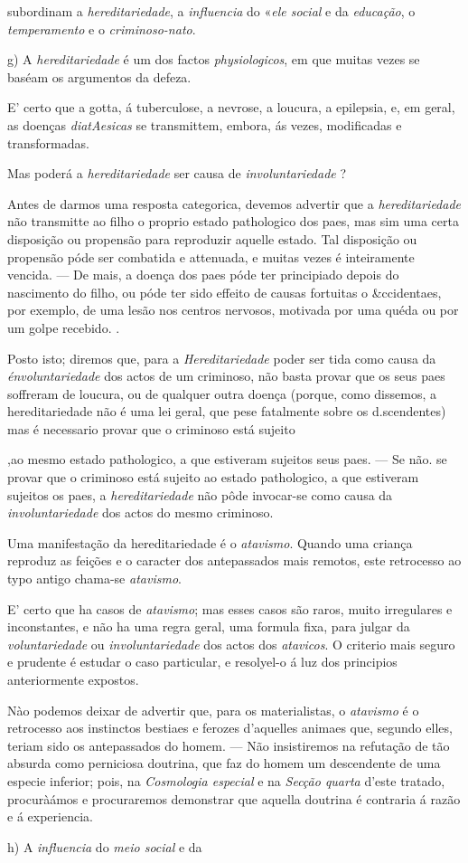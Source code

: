 subordinam a \emph{hereditariedade}, a \emph{influencia} do «\emph{ele social} e da \emph{educação}, o \emph{temperamento} e o \emph{criminoso-nato}.\par g) A \emph{hereditariedade} é um dos factos \emph{physiologicos}, em que muitas vezes se baséam os argumentos da defeza.\par E' certo que a gotta, á tuberculose, a nevrose, a loucura, a epilepsia, e, em geral, as doenças \emph{diatAesicas} se transmittem, embora, ás vezes, modificadas e transformadas.\par Mas poderá a \emph{hereditariedade} ser causa de \emph{involuntariedade} ?\par Antes de darmos uma resposta categorica, devemos advertir que a \emph{hereditariedade} não transmitte ao filho o proprio estado pathologico dos paes, mas sim uma certa disposição ou propensão para reproduzir aquelle estado. Tal disposição ou propensão póde ser combatida e attenuada, e muitas vezes é inteiramente vencida. --- De mais, a doença dos paes póde ter principiado depois do nascimento do filho, ou póde ter sido effeito de causas fortuitas o \&ccidentaes, por exemplo, de uma lesão nos centros nervosos, motivada por uma quéda ou por um golpe recebido. .\par Posto isto; diremos que, para a \emph{Hereditariedade} poder ser tida como causa da \emph{énvoluntariedade} dos actos de um criminoso, não basta provar que os seus paes soffreram de loucura, ou de qualquer outra doença (porque, como dissemos, a hereditariedade não é uma lei geral, que pese fatalmente sobre os d.scendentes) mas é necessario provar que o criminoso está sujeito\par ,ao mesmo estado pathologico, a que estiveram sujeitos seus paes. --- Se não. se provar que o criminoso está sujeito ao estado pathologico, a que estiveram sujeitos os paes, a \emph{hereditariedade} não pôde invocar-se como causa da \emph{involuntariedade} dos actos do mesmo criminoso.\par Uma manifestação da hereditariedade é o \emph{atavismo}. Quando uma criança reproduz as feições e o caracter dos antepassados mais remotos, este retrocesso ao typo antigo chama-se \emph{atavismo}.\par E' certo que ha casos de \emph{atavismo}; mas esses casos são raros, muito irregulares e inconstantes, e não ha uma regra geral, uma formula fixa, para julgar da \emph{voluntariedade} ou \emph{involuntariedade} dos actos dos \emph{atavicos}. O criterio mais seguro e prudente é estudar o caso particular, e resolyel-o á luz dos principios anteriormente expostos.\par Nào podemos deixar de advertir que, para os materialistas, o \emph{atavismo} é o retrocesso aos instinctos bestiaes e ferozes d'aquelles animaes que, segundo elles, teriam sido os antepassados do homem. --- Não insistiremos na refutação de tão absurda como perniciosa doutrina, que faz do homem um descendente de uma especie inferior; pois, na \emph{Cosmologia especial} e na \emph{Secção quarta} d'este tratado, procuràámos e procuraremos demonstrar que aquella doutrina é contraria á razão e á experiencia.\par h) A \emph{influencia} do \emph{meio social} e da 
